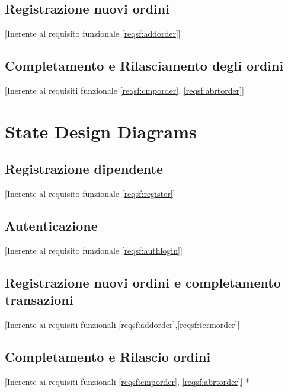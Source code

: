 	\subsection{Registrazione nuovi ordini}[Inerente al requisito funzionale \ref{reqsf:addorder}]

	\subsection{Completamento e Rilasciamento degli ordini}[Inerente ai requisiti funzionale \ref{reqsf:cmporder}, \ref{reqsf:abrtorder}]

	\section{State Design Diagrams}
	\subsection{Registrazione dipendente}[Inerente al requisito funzionale \ref{reqsf:register}]

	\subsection{Autenticazione}[Inerente al requisito funzionale \ref{reqsf:authlogin}]

	\subsection{Registrazione nuovi ordini e completamento transazioni}[Inerente ai requisiti funzionali \ref{reqsf:addorder},\ref{reqsf:termorder}]

	\subsection{Completamento e Rilascio ordini}[Inerente ai requisiti funzionali \ref{reqsf:cmporder}, \ref{reqsf:abrtorder}]
	*

